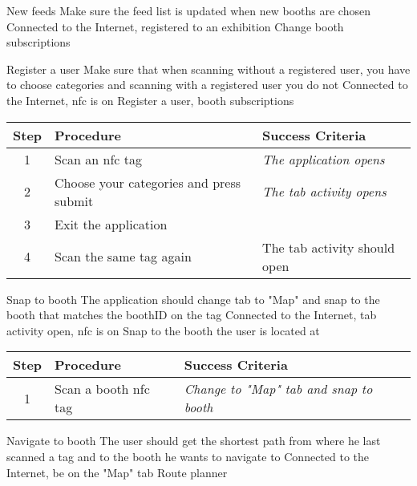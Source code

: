 
\newcommand{\casefive}{New feeds}
\newcommand{\casesix}{Register a user}
\newcommand{\caseseven}{Snap to booth}
\newcommand{\caseeight}{Navigate to booth}
\newcommand{\casenine}{Register new exhibition}

\testcase
{\casefive}
{Make sure the feed list is updated when new booths are chosen}
{Connected to the Internet, registered to an exhibition}
{Change booth subscriptions}


\testcase
{\casesix}
{Make sure that when scanning without a registered user, you have to choose categories and scanning with a registered user you do not}
{Connected to the Internet, \ac{nfc} is on}
{Register a user, booth subscriptions}

\begin{center}
\begin{tabular}{| c | p{4.6cm} | p{4.6cm} |}
\hline
\textbf{Step} & \textbf{Procedure} & \textbf{Success Criteria}\\
\hline
1 & Scan an \ac{nfc} tag & \textit{The application opens}\\
\hline
2 & Choose your categories and press submit & \textit{The tab activity opens}\\
\hline
3 & Exit the application & \\
4 & Scan the same tag again & The tab activity should open\\
\hline
\end{tabular}
\end{center}

\testcase
{\caseseven}
{The application should change tab to "Map" and snap to the booth that matches the boothID on the tag}
{Connected to the Internet,  tab activity open, \ac{nfc} is on}
{Snap to the booth the user is located at}

\begin{center}
\begin{tabular}{| c | p{4.6cm} | p{4.6cm} |}
\hline
\textbf{Step} & \textbf{Procedure} & \textbf{Success Criteria}\\
\hline
1 & Scan a booth \ac{nfc} tag& \textit{Change to "Map" tab and snap to booth}\\
\hline
\end{tabular}
\end{center}

\testcase
{\caseeight}
{The user should get the shortest path from where he last scanned a tag and to the booth he wants to navigate to}
{Connected to the Internet, be on the "Map" tab}
{Route planner}

